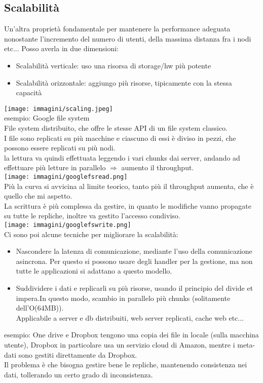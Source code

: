 \documentclass[16px]{article}
\begin{document}
\subsection{Scalabilità}
Un'altra proprietà fondamentale per mantenere la performance adeguata nonostante l'incremento del numero di utenti, della massima distanza fra i nodi etc... Posso averla in due dimensioni:
\begin{itemize}
\item Scalabilità verticale: uso una risorsa di storage/hw più potente
\item Scalabilità orizzontale: aggiungo più risorse, tipicamente con la stessa capacità 
\end{itemize}
\texttt{[image: immagini/scaling.jpeg]}\\
esempio: Google file system\\ File system distribuito, che offre le stesse API di un file system classico. \\ I file sono replicati su più macchine e ciascuno di essi è diviso in pezzi, che possono essere replicati su più nodi.\\ la lettura va quindi effettuata leggendo i vari chunks dai server, andando ad effettuare più letture in parallelo $\Rightarrow$ aumento il throughput.\\
\texttt{[image: immagini/googlefsread.png]}\\
Più la curva si avvicina al limite teorico, tanto più il throughput aumenta, che è quello che mi aspetto.\\ La scrittura è più complessa da gestire, in quanto le modifiche vanno propagate su tutte le repliche, inoltre va gestito l'accesso condiviso.\\
\texttt{[image: immagini/googlefswrite.png]}\\
Ci sono poi alcune tecniche per migliorare la scalabilità:
\begin{itemize}
\item Nascondere la latenza di comunicazione, mediante l'uso della comunicazione asincrona. Per questo si possono usare degli handler per la gestione, ma non tutte le applicazioni si adattano a questo modello.
\item Suddividere i dati e replicarli su più risorse, usando il principio del divide et impera.In questo modo, scambio in parallelo più chunks (solitamente dell'O(64MB)).\\ Applicabile a server e db distribuiti, web server replicati, cache web etc...
\end{itemize}
esempio: One drive e Dropbox tengono una copia dei file in locale (sulla macchina utente), Dropbox in particolare usa un servizio cloud di Amazon, mentre i meta-dati sono gestiti direttamente da Dropbox.\\
Il problema è che bisogna gestire bene le repliche, mantenendo consistenza nei dati, tollerando un certo grado di inconsistenza.
\end{document}
